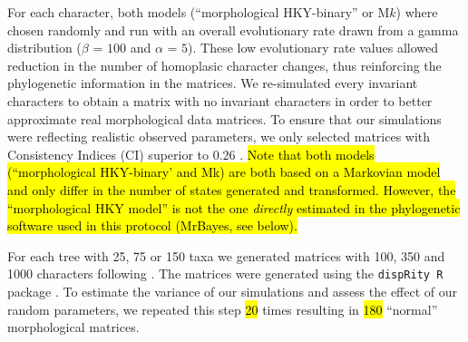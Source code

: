 \documentclass[12pt,letterpaper]{article}
\begin{document}
\noindent For each character, both models (``morphological HKY-binary'' or M$k$) where chosen randomly and run with an overall evolutionary rate drawn from a gamma distribution ($\beta$ = $100$ and $\alpha$ = $5$).
These low evolutionary rate values allowed reduction in the number of homoplasic character changes, thus reinforcing the phylogenetic information in the matrices.
We re-simulated every invariant characters to obtain a matrix with no invariant characters in order to better approximate real morphological data matrices.
To ensure that our simulations were reflecting realistic observed parameters, we only selected matrices with Consistency Indices (CI) superior to $0.26$ \citep{sanderson1989patterns,OReilly20160081}.
\hl{Note that both models (``morphological HKY-binary' and Mk) are both based on a Markovian model and only differ in the number of states generated and transformed.
However, the ``morphological HKY model'' is not the one \textit{directly} estimated in the phylogenetic software used in this protocol (MrBayes, see below).}

For each tree with 25, 75 or 150 taxa we generated matrices with 100, 350 and 1000 characters following \cite{OReilly20160081}.
The matrices were generated using the \texttt{dispRity R} package \citep{thomas_guillerme_2016_55646}.
To estimate the variance of our simulations and assess the effect of our random parameters, we repeated this step \hl{20} times resulting in \hl{180} ``normal'' morphological matrices.
\end{document}
